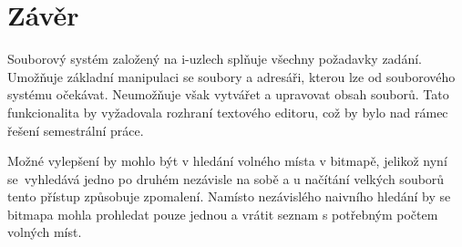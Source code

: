 \documentclass[12pt]{report}
\begin{document}
	\chapter{Závěr}
	Souborový systém založený na i-uzlech splňuje všechny požadavky zadání. Umožňuje základní manipulaci se soubory a adresáři, kterou lze od souborového systému očekávat. Neumožňuje však vytvářet a upravovat obsah souborů. Tato funkcionalita by vyžadovala rozhraní textového editoru, což by bylo nad rámec řešení semestrální práce. 
	
	Možné vylepšení by mohlo být v hledání volného místa v bitmapě, jelikož nyní se~vyhledává jedno po druhém nezávisle na sobě a u načítání velkých souborů tento přístup způsobuje zpomalení. Namísto nezávislého naivního hledání by se bitmapa mohla prohledat pouze jednou a vrátit seznam s potřebným počtem volných míst.
\end{document}
